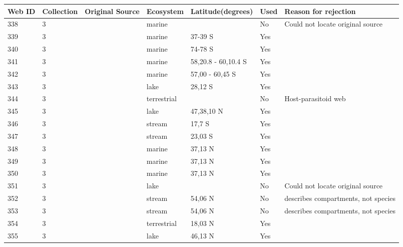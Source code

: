 \documentclass[12pt]{article}
\begin{document}
\begin{landscape}
    \begin{table}[h!]
    \centering
    {\footnotesize
      \begin{tabular}{p{2.8cm}p{1.3cm}p{5.5cm}p{2.2cm}p{2.5cm}lp{3.5cm}}
        \hline
        Web ID & Collection & Original Source & Ecosystem & Latitude(degrees) & Used  & Reason for rejection  \\
        \hline
        338   & 3 & \cite{Torres2013}  & marine &       & No    & Could not locate original source \\
        339   & 3 & \cite{Bulman2001}  & marine & 37-39 S & Yes   &       \\
        340   & 3 & \cite{Smith2007}  & marine & 74-78 S & Yes   &       \\
        341   & 3 & \cite{Lancraft1991}  & marine & 58,20.8 - 60,10.4 S & Yes   &       \\
        342   & 3 & \cite{Hopkins1993}  & marine & 57,00 - 60,45 S & Yes   &       \\
        343   & 3 & \cite{Kitching1987}  & lake  & 28,12 S & Yes   &       \\
        344   & 3 & \cite{Hodkinson2004}  & terrestrial &       & No    & Host-parasitoid web \\
        345   & 3 & \cite{Boit2012}  & lake  & 47,38,10 N & Yes   &       \\
        346   & 3 & \cite{Rayner2010}  & stream & 17,7 S & Yes   &       \\
        347   & 3 & \cite{Motta2005}  & stream & 23,03 S & Yes   &       \\
        348   & 3 & \cite{Douglass2011}    & marine & 37,13 N & Yes   &       \\
        349   & 3 & \cite{Douglass2011}    & marine & 37,13 N & Yes   &       \\
        350   & 3 & \cite{Douglass2011}    & marine & 37,13 N & Yes   &       \\
        351   & 3 & \cite{Warren1989}     & lake  &       & No    & Could not locate original source \\
        352   & 3 & \cite{Poepperl2003}  & stream & 54,06 N & No    & describes compartments, not species \\
        353   & 3 & \cite{Poepperl2003}  & stream & 54,06 N & No    & describes compartments, not species \\
        354   & 3 & \cite{Goldwasser1993}  & terrestrial & 18,03 N & Yes   &       \\
        355   & 3 & \cite{Cohen2003}    & lake  & 46,13 N & Yes   &       \\

\end{tabular}}
\end{table}
\end{landscape}
\end{document}
